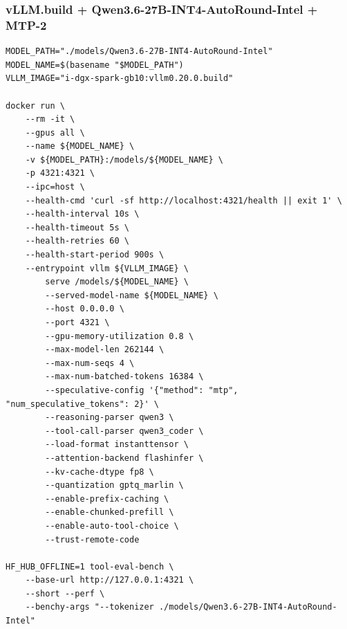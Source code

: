 \documentclass{article}
\begin{document}
\subsubsection{vLLM.build + Qwen3.6-27B-INT4-AutoRound-Intel + MTP-2}
\begin{lstlisting}
MODEL_PATH="./models/Qwen3.6-27B-INT4-AutoRound-Intel"
MODEL_NAME=$(basename "$MODEL_PATH")
VLLM_IMAGE="i-dgx-spark-gb10:vllm0.20.0.build"

docker run \
    --rm -it \
    --gpus all \
    --name ${MODEL_NAME} \
    -v ${MODEL_PATH}:/models/${MODEL_NAME} \
    -p 4321:4321 \
    --ipc=host \
    --health-cmd 'curl -sf http://localhost:4321/health || exit 1' \
    --health-interval 10s \
    --health-timeout 5s \
    --health-retries 60 \
    --health-start-period 900s \
    --entrypoint vllm ${VLLM_IMAGE} \
        serve /models/${MODEL_NAME} \
        --served-model-name ${MODEL_NAME} \
        --host 0.0.0.0 \
        --port 4321 \
        --gpu-memory-utilization 0.8 \
        --max-model-len 262144 \
        --max-num-seqs 4 \
        --max-num-batched-tokens 16384 \
        --speculative-config '{"method": "mtp", "num_speculative_tokens": 2}' \
        --reasoning-parser qwen3 \
        --tool-call-parser qwen3_coder \
        --load-format instanttensor \
        --attention-backend flashinfer \
        --kv-cache-dtype fp8 \
        --quantization gptq_marlin \
        --enable-prefix-caching \
        --enable-chunked-prefill \
        --enable-auto-tool-choice \
        --trust-remote-code

HF_HUB_OFFLINE=1 tool-eval-bench \
    --base-url http://127.0.0.1:4321 \
    --short --perf \
    --benchy-args "--tokenizer ./models/Qwen3.6-27B-INT4-AutoRound-Intel"
\end{lstlisting}
\end{document}
